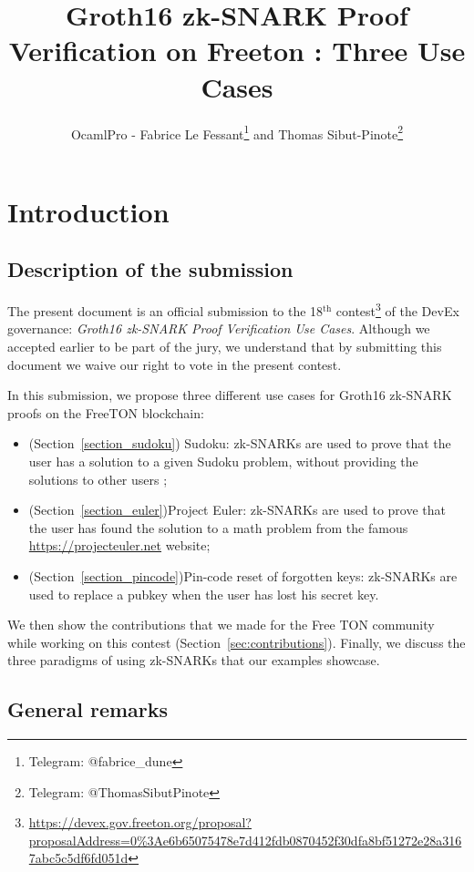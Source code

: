 \documentclass[10pt,a4paper]{article}
\author{OcamlPro - Fabrice Le Fessant\footnote{Telegram: @fabrice\_dune} and Thomas Sibut-Pinote\footnote{Telegram: @ThomasSibutPinote}}
\title{Groth16 zk-SNARK Proof Verification on Freeton : Three Use Cases}
\begin{document}
\maketitle

\newcommand{\zksnark}{zk-SNARK}
\newcommand{\zksnarks}{zk-SNARKs}


\section{Introduction}
\label{sec:intro}

\subsection{Description of the submission}
\label{subsec:description}

The present document is an official submission to the 18$^{\text{th}}$
contest\footnote{\url{https://devex.gov.freeton.org/proposal?proposalAddress=0\%3Ae6b65075478e7d412fdb0870452f30dfa8bf51272e28a3167abc5c5df6fd051d}}
of the DevEx governance: {\em Groth16 \zksnark{} Proof Verification Use
  Cases}. Although we accepted earlier to be part of the jury, we
understand that by submitting this document we waive our right to vote
in the present contest.

In this submission, we propose three different use cases for Groth16
\zksnark{} proofs on the FreeTON blockchain:
\begin{itemize}
\item (Section~\ref{section_sudoku}) Sudoku: \zksnarks{} are used to prove that the user has a solution
  to a given Sudoku problem, without providing the solutions to other
  users ;
\item (Section~\ref{section_euler})Project Euler: \zksnarks{} are used to prove that the user has found the solution to a math problem from the famous \url{https://projecteuler.net} website;
\item (Section~\ref{section_pincode})Pin-code reset of forgotten keys: \zksnarks{} are used to replace a
  pubkey when the user has lost his secret key.
\end{itemize}

We then show the contributions that we made for the Free TON community while working on
this contest (Section~\ref{sec:contributions}). Finally, we discuss the three paradigms of using \zksnarks{} that our examples showcase.

\subsection{General remarks}
\label{subsec:general_remarks}
\end{document}

